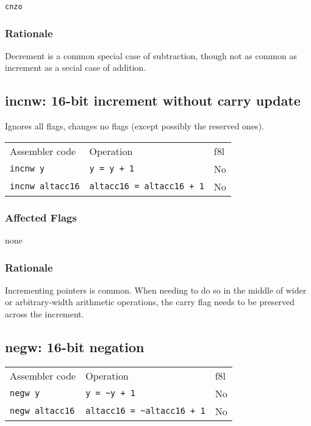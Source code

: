 \documentclass{book}
\begin{document}
\texttt{cnzo}

\subsubsection*{Rationale}

Decrement is a common special case of subtraction, though not as common as increment as a secial case of addition.


\subsection{incnw: 16-bit increment without carry update}

Ignores all flags, changes no flags (except possibly the reserved ones).

\begin{tabular}{l l l}
Assembler code          & Operation                        & f8l \\
\texttt{incnw y}        & \texttt{y = y + 1}               & No \\
\texttt{incnw altacc16} & \texttt{altacc16 = altacc16 + 1} & No \\
\end{tabular}

\subsubsection*{Affected Flags}

none

\subsubsection*{Rationale}

Incrementing pointers is common. When needing to do so in the middle of wider or arbitrary-width arithmetic operations, the carry flag needs to be preserved across the increment.


\subsection{negw: 16-bit negation}

\begin{tabular}{l l l}
Assembler code         & Operation                            & f8l \\
\texttt{negw y}        & \texttt{y = \~{}y + 1}               & No \\
\texttt{negw altacc16} & \texttt{altacc16 = \~{}altacc16 + 1} & No \\
\end{tabular}
\end{document}
